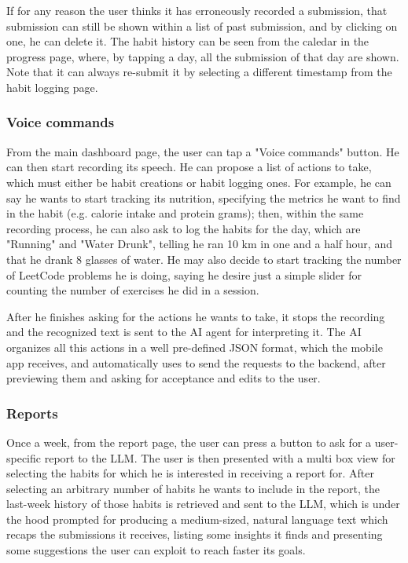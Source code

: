 \documentclass{article}
\begin{document}
If for any reason the user thinks it has erroneously recorded a submission, that submission can still be shown within a list of past submission, and by clicking on one, he can delete it.
The habit history can be seen from the caledar in the progress page, where, by tapping a day, all the submission of that day are shown.
Note that it can always re-submit it by selecting a different timestamp from the habit logging page.

\subsubsection{Voice commands}

From the main dashboard page, the user can tap a "Voice commands" button.
He can then start recording its speech.
He can propose a list of actions to take, which must either be habit creations or habit logging ones.
For example, he can say he wants to start tracking its nutrition, specifying the metrics he want to find in the habit (e.g. calorie intake and protein grams); then, within the same recording process, he can also ask to log the habits for the day, which are "Running" and "Water Drunk", telling he ran 10 km in one and a half hour, and that he drank 8 glasses of water.
He may also decide to start tracking the number of LeetCode problems he is doing, saying he desire just a simple slider for counting the number of exercises he did in a session.

After he finishes asking for the actions he wants to take, it stops the recording and the recognized text is sent to the AI agent for interpreting it.
The AI organizes all this actions in a well pre-defined JSON format, which the mobile app receives, and automatically uses to send the requests to the backend, after previewing them and asking for acceptance and edits to the user.

\subsubsection{Reports}

Once a week, from the report page, the user can press a button to ask for a user-specific report to the LLM.
The user is then presented with a multi box view for selecting the habits for which he is interested in receiving a report for.
After selecting an arbitrary number of habits he wants to include in the report, the last-week history of those habits is retrieved and sent to the LLM, which is under the hood prompted for producing a medium-sized, natural language text which recaps the submissions it receives, listing some insights it finds and presenting some suggestions the user can exploit to reach faster its goals.
\end{document}
